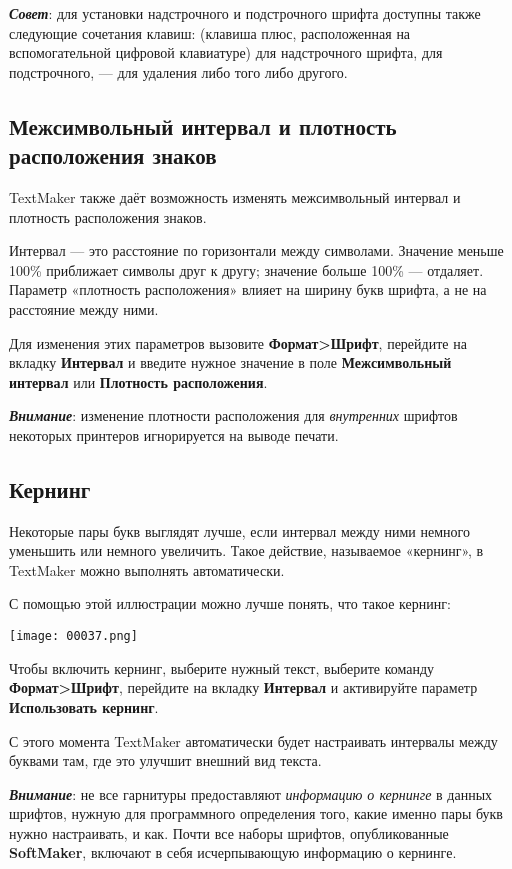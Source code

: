 ﻿\documentclass[a4paper,10pt]{article}
\begin{document}
\textbf{\textit{Совет}}: для установки надстрочного и подстрочного шрифта доступны также следующие сочетания клавиш:  (клавиша плюс, расположенная на вспомогательной цифровой клавиатуре) для надстрочного шрифта,  для подстрочного,  — для удаления либо того либо другого.

\subsection{Межсимвольный интервал и плотность расположения знаков}
TextMaker также даёт возможность изменять межсимвольный интервал и плотность расположения знаков.

Интервал — это расстояние по горизонтали между символами. Значение меньше 100\% приближает символы друг к другу; значение больше 100\% — отдаляет.
Параметр «плотность расположения» влияет на ширину букв шрифта, а не на расстояние между ними.

Для изменения этих параметров вызовите \textbf{Формат>Шрифт}, перейдите на вкладку \textbf{Интервал} и введите нужное значение в поле \textbf{Межсимвольный интервал} или \textbf{Плотность расположения}.

\textit{\textbf{Внимание}}: изменение плотности расположения для \textit{внутренних} шрифтов некоторых принтеров игнорируется на выводе печати.

\subsection{Кернинг}
Некоторые пары букв выглядят лучше, если интервал между ними немного уменьшить или немного увеличить. Такое действие, называемое «кернинг», в TextMaker можно выполнять автоматически.

С помощью этой иллюстрации можно лучше понять, что такое кернинг:

\texttt{[image: 00037.png]}

Чтобы включить кернинг, выберите нужный текст, выберите команду \textbf{Формат>Шрифт}, перейдите на вкладку \textbf{Интервал} и активируйте параметр \textbf{Использовать кернинг}.

С этого момента TextMaker автоматически будет настраивать интервалы между буквами там, где это улучшит внешний вид текста.

\textit{\textbf{Внимание}}: не все гарнитуры предоставляют \textit{информацию о кернинге} в данных шрифтов, нужную для программного определения того, какие именно пары букв нужно настраивать, и как. Почти все наборы шрифтов, опубликованные \textbf{SoftMaker}, включают в себя исчерпывающую информацию о кернинге.
\end{document}

